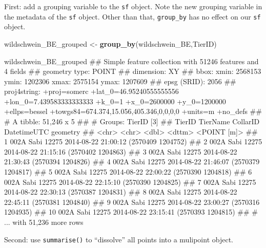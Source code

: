 \documentclass[]{book}
\newenvironment{Shaded}{\begin{snugshade}}{\end{snugshade}}
\newcommand{\KeywordTok}[1]{\textcolor[rgb]{0.13,0.29,0.53}{\textbf{#1}}}
\newcommand{\StringTok}[1]{\textcolor[rgb]{0.31,0.60,0.02}{#1}}
\newcommand{\NormalTok}[1]{#1}
\begin{document}
First: add a grouping variable to the \texttt{sf} object. Note the new
grouping variable in the metadata of the \texttt{sf} object. Other than
that, \texttt{group\_by} has no effect on our \texttt{sf} object.

\begin{Shaded}
\begin{Highlighting}[]
\NormalTok{wildschwein_BE_grouped <-}\StringTok{ }\KeywordTok{group_by}\NormalTok{(wildschwein_BE,TierID)}

\NormalTok{wildschwein_BE_grouped}
\NormalTok{## Simple feature collection with 51246 features and 4 fields}
\NormalTok{## geometry type:  POINT}
\NormalTok{## dimension:      XY}
\NormalTok{## bbox:           xmin: 2568153 ymin: 1202306 xmax: 2575154 ymax: 1207609}
\NormalTok{## epsg (SRID):    2056}
\NormalTok{## proj4string:    +proj=somerc +lat_0=46.95240555555556 +lon_0=7.439583333333333 +k_0=1 +x_0=2600000 +y_0=1200000 +ellps=bessel +towgs84=674.374,15.056,405.346,0,0,0,0 +units=m +no_defs}
\NormalTok{## # A tibble: 51,246 x 5}
\NormalTok{## # Groups:   TierID [3]}
\NormalTok{##    TierID TierName CollarID DatetimeUTC                  geometry}
\NormalTok{##    <chr>  <chr>       <dbl> <dttm>                    <POINT [m]>}
\NormalTok{##  1 002A   Sabi        12275 2014-08-22 21:00:12 (2570409 1204752)}
\NormalTok{##  2 002A   Sabi        12275 2014-08-22 21:15:16 (2570402 1204863)}
\NormalTok{##  3 002A   Sabi        12275 2014-08-22 21:30:43 (2570394 1204826)}
\NormalTok{##  4 002A   Sabi        12275 2014-08-22 21:46:07 (2570379 1204817)}
\NormalTok{##  5 002A   Sabi        12275 2014-08-22 22:00:22 (2570390 1204818)}
\NormalTok{##  6 002A   Sabi        12275 2014-08-22 22:15:10 (2570390 1204825)}
\NormalTok{##  7 002A   Sabi        12275 2014-08-22 22:30:13 (2570387 1204831)}
\NormalTok{##  8 002A   Sabi        12275 2014-08-22 22:45:11 (2570381 1204840)}
\NormalTok{##  9 002A   Sabi        12275 2014-08-22 23:00:27 (2570316 1204935)}
\NormalTok{## 10 002A   Sabi        12275 2014-08-22 23:15:41 (2570393 1204815)}
\NormalTok{## # ... with 51,236 more rows}
\end{Highlighting}
\end{Shaded}

Second: use \texttt{summarise()} to ``dissolve'' all points into a
mulipoint object.
\end{document}
